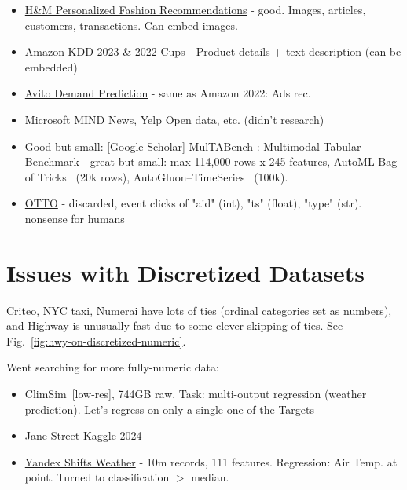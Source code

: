 \documentclass[11pt]{article}
\begin{document}
\begin{itemize}
    \item \href{https://www.kaggle.com/competitions/h-and-m-personalized-fashion-recommendations/data}{H\&M Personalized Fashion Recommendations} - good. Images, articles, customers, transactions. Can embed images.
    \item \href{https://www.aicrowd.com/challenges/amazon-kdd-cup-23-multilingual-recommendation-challenge}{Amazon KDD 2023 \& 2022 Cups} - Product details + text description (can be embedded)
    \item \href{https://www.kaggle.com/competitions/avito-demand-prediction/data}{Avito Demand Prediction} - same as Amazon 2022: Ads rec.
    \item Microsoft MIND News, Yelp Open data, etc. (didn't research)
    \item Good but small: [Google Scholar] MulTABench \cite{arazi_multabench_2026}: Multimodal Tabular Benchmark - great but small: max 114,000 rows x 245 features, AutoML Bag of Tricks~\cite{tang_bag_2024} (20k rows), AutoGluon–TimeSeries~\cite{shchur_autogluon-timeseries_2023} (100k).
    \item {\color{gray}\href{https://www.kaggle.com/competitions/otto-recommender-system}{OTTO} - discarded, event clicks of "aid" (int), "ts" (float), "type" (str). nonsense for humans }
\end{itemize}


\section{Issues with Discretized Datasets}
\label{sec:discretized-datasets-issue}

Criteo, NYC taxi, Numerai have lots of ties (ordinal categories set as numbers), and Highway is unusually fast due to some clever skipping of ties. See Fig.~\ref{fig:hwy-on-discretized-numeric}.


Went searching for more fully-numeric data:

\begin{itemize}
    \item ClimSim~\cite{yu2023climsim}[low-res], 744GB raw. Task: multi-output regression (weather prediction). Let's regress on only a single one of the Targets
    \item \href{https://www.kaggle.com/competitions/jane-street-real-time-market-data-forecasting/data}{Jane Street Kaggle 2024}
    \item \href{https://research.yandex.com/shifts/weather}{Yandex Shifts Weather} - 10m records, 111 features. Regression: Air Temp. at point. Turned to classification $>$ median.
\end{itemize}
\end{document}
